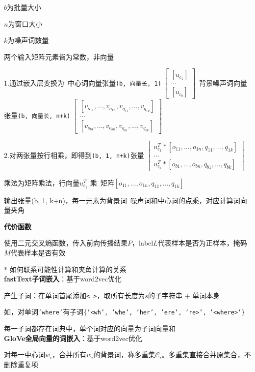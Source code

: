 \documentclass[UTF8]{ctexart}
\begin{document}
  \quad \quad $b$为批量大小

  \quad \quad $n$为窗口大小

  \quad \quad $k$为噪声词数量

  \quad \quad 两个输入矩阵元素皆为常数，非向量

  \quad 1.通过嵌入层变换为\ 中心词向量张量\texttt{(b, 向量长, 1)}
  $\begin{bmatrix}
    [u_{c_1}] \\
    ... \\
    [u_{c_b}]
    \end{bmatrix}
  $\ 背景噪声词向量张量\texttt{(b, 向量长, n+k)}
  $\begin{bmatrix}
    [v_{o_{11}}, ..., v_{o_{1n}}, v_{q_{11}}, ..., v_{q_{1k}}] \\
    ... \\
    [v_{o_{b1}}, ..., v_{o_{bn}}, v_{q_{b1}}, ..., v_{q_{bk}}]
    \end{bmatrix}
  $

  \quad 2.对两张量按行相乘，即得到\texttt{(b, 1, n+k)}张量
  $\begin{bmatrix}
    u_{c_1}^T * [o_{11}, ..., o_{1n}, q_{11}, ..., q_{1k}] \\
    ... \\
    u_{c_b}^T * [o_{b1}, ..., o_{bn}, q_{b1}, ..., q_{bk}]
    \end{bmatrix}
  $

  \quad 乘法为矩阵乘法，行向量$u_{c_1}^T$ 乘\ 矩阵$[o_{11}, ..., o_{1n}, q_{11}, ..., q_{1k}]$
  
  \quad 输出张量(b, 1, k+n)，每一元素为背景词\ 噪声词和中心词的点乘，对应计算词向量夹角
  
  \textbf{代价函数}

  \quad 使用二元交叉熵函数，传入前向传播结果$P$，label$L$代表样本是否为正样本，掩码$M$代表样本是否有效

  \quad ** 如何联系可能性计算和夹角计算的关系\\
\textbf{fastText子词嵌入}：基于word2vec优化

  产生子词：在单词首尾添加\texttt{< >}，取所有长度为$s$的子字符串 + 单词本身

  \quad 如，对单词\texttt{'where'}有子词\texttt{\{'<wh', 'whe', 'her', 'ere', 're>', '<where>'\}}

  每一子词都存在词典中，单个词对应的向量为子词向量和\\
\textbf{GloVe全局向量的词嵌入}：基于word2vec优化

  对每一中心词$w_i$，合并所有$w_i$的背景词，称多重集$\mathcal{C}_i$。多重集直接合并原集合，不删除重复项
\end{document}
